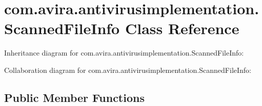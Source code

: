 \hypertarget{classcom_1_1avira_1_1antivirusimplementation_1_1_scanned_file_info}{}\section{com.\+avira.\+antivirusimplementation.\+Scanned\+File\+Info Class Reference}
\label{classcom_1_1avira_1_1antivirusimplementation_1_1_scanned_file_info}


Inheritance diagram for com.\+avira.\+antivirusimplementation.\+Scanned\+File\+Info\+:


Collaboration diagram for com.\+avira.\+antivirusimplementation.\+Scanned\+File\+Info\+:
\subsection*{Public Member Functions}
